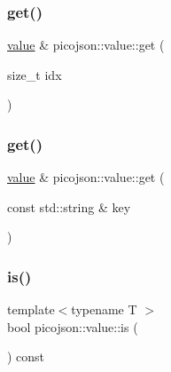 \hypertarget{classpicojson_1_1value_adf5edc5f70df6a5ebe78bb32c2ba3e91}{}\label{classpicojson_1_1value_adf5edc5f70df6a5ebe78bb32c2ba3e91} 
\subsubsection{\texorpdfstring{get()}{get()}\hspace{0.1cm}{\footnotesize\ttfamily [5/6]}}
{\footnotesize\ttfamily \hyperlink{classpicojson_1_1value}{value} \& picojson\+::value\+::get (\begin{DoxyParamCaption}\item[{size\+\_\+t}]{idx }\end{DoxyParamCaption})\hspace{0.3cm}{\ttfamily [inline]}}

\hypertarget{classpicojson_1_1value_a72f3216a2536e4e088e70b0f1617fc11}{}\label{classpicojson_1_1value_a72f3216a2536e4e088e70b0f1617fc11} 
\subsubsection{\texorpdfstring{get()}{get()}\hspace{0.1cm}{\footnotesize\ttfamily [6/6]}}
{\footnotesize\ttfamily \hyperlink{classpicojson_1_1value}{value} \& picojson\+::value\+::get (\begin{DoxyParamCaption}\item[{const std\+::string \&}]{key }\end{DoxyParamCaption})\hspace{0.3cm}{\ttfamily [inline]}}

\hypertarget{classpicojson_1_1value_afd038ffc8a714c5d2f4b59adaaaca4ce}{}\label{classpicojson_1_1value_afd038ffc8a714c5d2f4b59adaaaca4ce} 
\subsubsection{\texorpdfstring{is()}{is()}\hspace{0.1cm}{\footnotesize\ttfamily [1/2]}}
{\footnotesize\ttfamily template$<$typename T $>$ \\
bool picojson\+::value\+::is (\begin{DoxyParamCaption}{ }\end{DoxyParamCaption}) const}

